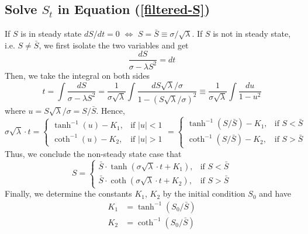 \documentclass[mnsc]{informs3}
\begin{document}
\newpage
\begin{APPENDICES}





\section{Solve $S_t$ in Equation (\ref{filtered-S})}\label{app-S-equ}

If $S$ is in steady state $dS/dt = 0$ $\Leftrightarrow$ $S = \bar{S} \equiv \sigma/\sqrt{\lambda}$. 
If $S$ is not in steady state, i.e. $S\not=\bar{S}$, we first isolate the two variables and get 
\begin{equation*}
	\frac{dS}{\sigma-\lambda S^2} = dt
\end{equation*}
Then, we take the integral on both sides
\begin{equation*}
    t = \int \frac{dS}{\sigma-\lambda S^2} = \frac{1}{\sigma\sqrt{\lambda}} \int \frac{dS\sqrt{\lambda}/\sigma}{1 - (S\sqrt{\lambda}/\sigma)^2} \equiv \frac{1}{\sigma\sqrt{\lambda}}\int \frac{du}{1-u^2} 
\end{equation*}
where $u = S\sqrt{\lambda}/\sigma = S/\bar{S}$. Hence, 
\begin{equation*}
    \sigma\sqrt{\lambda}\cdot t = \begin{cases}
        \tanh^{-1}(u)-K_1, & \text{if } |u|<1\\
        \coth^{-1}(u)-K_2, & \text{if } |u|>1
    \end{cases} = \begin{cases}
        \tanh^{-1}(S/\bar{S})-K_1, & \text{if } S<\bar{S}\\
        \coth^{-1}(S/\bar{S})-K_2, & \text{if } S>\bar{S} 
\end{cases}
\end{equation*}
Thus, we conclude the non-steady state case that 
\begin{equation*}
	S = \begin{cases}
		\bar{S}\cdot\tanh(\sigma\sqrt{\lambda}\cdot t + K_1), & \text{if } S<\bar{S}\\
		\bar{S}\cdot\coth(\sigma\sqrt{\lambda}\cdot t + K_2), & \text{if } S>\bar{S} 
	\end{cases}
\end{equation*}
Finally, we determine the constants $K_1$, $K_2$ by the initial condition $S_0$ and have 
\begin{align*}
	K_1 &= \tanh^{-1}(S_0/\bar{S})\\
	K_2 &= \coth^{-1}(S_0/\bar{S})
\end{align*}




\end{APPENDICES}
\end{document}
